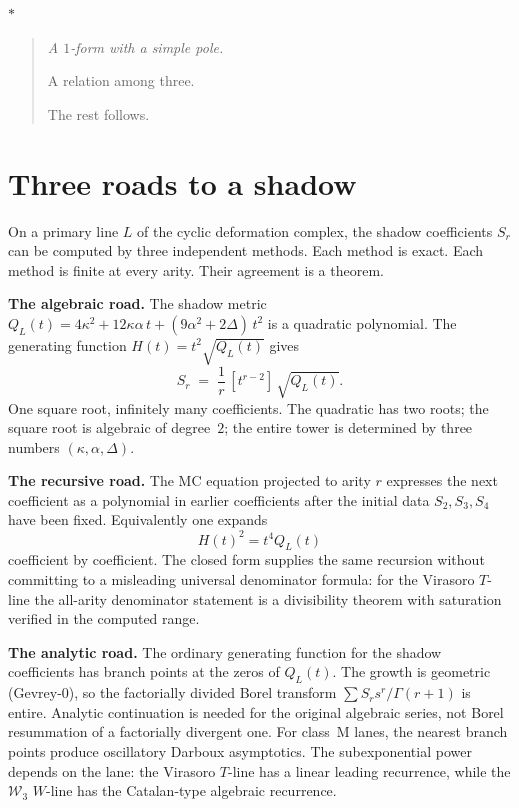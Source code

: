 \documentclass[11pt]{article}
\newcommand{\cW}{\mathcal{W}}
\newcommand{\sep}{\bigskip\begin{center}$*$\end{center}\medskip}
\begin{document}
\sep

\begin{quote}\itshape
A $1$-form with a simple pole.

A relation among three.

The rest follows.
\end{quote}


\section{Three roads to a shadow}
\label{sec:three-roads}

On a primary line $L$ of the cyclic deformation complex, the
shadow coefficients $S_r$ can be computed by three independent
methods.  Each method is exact.  Each method is finite at every
arity.  Their agreement is a theorem.

\medskip
\noindent\textbf{The algebraic road.}\enspace
The shadow metric $Q_L(t) = 4\kappa^2 + 12\kappa\alpha\,t
+ (9\alpha^2 + 2\Delta)\,t^2$ is a quadratic polynomial.  The
generating function $H(t) = t^2\sqrt{Q_L(t)}$ gives
\begin{equation}\label{eq:algebraic-road}
S_r \;=\; \frac{1}{r}\,[t^{r-2}]\,\sqrt{Q_L(t)}.
\end{equation}
One square root, infinitely many coefficients.  The quadratic
has two roots; the square root is algebraic of degree~$2$; the
entire tower is determined by three numbers $(\kappa, \alpha,
\Delta)$.

\medskip
\noindent\textbf{The recursive road.}\enspace
The MC equation projected to arity $r$ expresses the next
coefficient as a polynomial in earlier coefficients after the
initial data $S_2,S_3,S_4$ have been fixed.  Equivalently one
expands
\begin{equation}\label{eq:recursive-road}
H(t)^2=t^4Q_L(t)
\end{equation}
coefficient by coefficient.  The closed form supplies the
same recursion without committing to a misleading universal
denominator formula: for the Virasoro $T$-line the all-arity
denominator statement is a divisibility theorem with saturation
verified in the computed range.

\medskip
\noindent\textbf{The analytic road.}\enspace
The ordinary generating function for the shadow coefficients has
branch points at the zeros of $Q_L(t)$.  The growth is geometric
(Gevrey-$0$), so the factorially divided Borel transform
$\sum S_r s^r/\Gamma(r+1)$ is entire.  Analytic continuation
is needed for the original algebraic series, not Borel
resummation of a factorially divergent one.  For class~M lanes,
the nearest branch points produce oscillatory Darboux
asymptotics.  The subexponential power depends on the lane:
the Virasoro $T$-line has a linear leading recurrence, while the
$\cW_3$ $W$-line has the Catalan-type algebraic recurrence.
\end{document}
